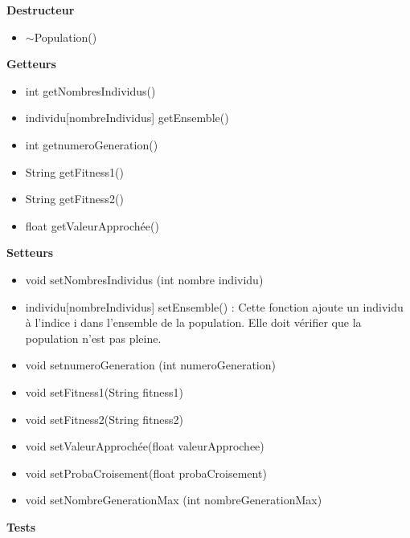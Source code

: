 \documentclass[a4paper,11pt]{article}
\begin{document}
			\textbf{Destructeur}
					\begin{itemize}
							\item $\sim$Population()\\
					\end{itemize}
			\textbf{Getteurs}
					\begin{itemize}
							\item int getNombresIndividus()
							\item individu[nombreIndividus] getEnsemble()
							\item int getnumeroGeneration()
							\item String getFitness1()
							\item String getFitness2()
							\item float getValeurApprochée()\\
					\end{itemize}
			\textbf{Setteurs}
					\begin{itemize}
							\item void setNombresIndividus (int nombre individu)
							\item individu[nombreIndividus] setEnsemble() : Cette fonction ajoute un individu à l’indice i dans l’ensemble de la population.
																			Elle doit vérifier que la population n’est pas pleine.
							\item void setnumeroGeneration (int numeroGeneration)
							\item void setFitness1(String fitness1)
							\item void setFitness2(String fitness2)
							\item void setValeurApprochée(float valeurApprochee)
							\item void setProbaCroisement(float probaCroisement)
							\item void setNombreGenerationMax (int nombreGenerationMax)\\
					\end{itemize}
			\textbf{Tests}
\end{document}
